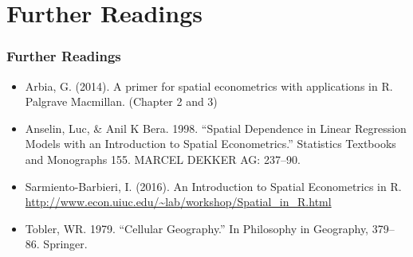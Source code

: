\documentclass[
  shownotes,
  xcolor={svgnames},
  hyperref={colorlinks,citecolor=DarkBlue,linkcolor=DarkRed,urlcolor=DarkBlue}
  ]{beamer}
\begin{document}
\section{Further Readings}
\begin{frame}
\frametitle{Further Readings}

\begin{itemize}

   
  \item Arbia, G. (2014). A primer for spatial econometrics with applications in R. Palgrave Macmillan. (Chapter 2 and 3)
  \medskip
  \item Anselin, Luc, \& Anil K Bera. 1998. “Spatial Dependence in Linear Regression Models with an Introduction to Spatial Econometrics.” Statistics Textbooks and Monographs 155. MARCEL DEKKER AG: 237–90.
  \medskip
  \item Sarmiento-Barbieri, I. (2016). An Introduction to Spatial Econometrics in R. \url{http://www.econ.uiuc.edu/~lab/workshop/Spatial_in_R.html}
  \medskip
  \item Tobler, WR. 1979. “Cellular Geography.” In Philosophy in Geography, 379–86. Springer.
\end{itemize}

\end{frame}






\end{document}

